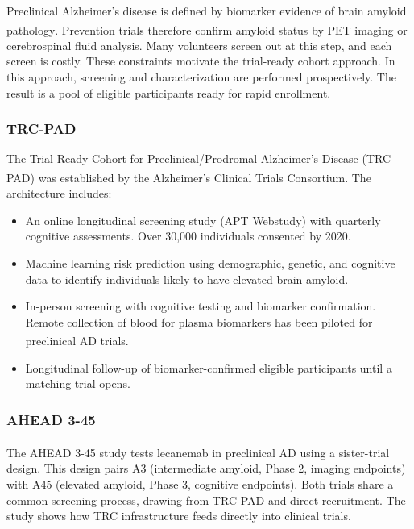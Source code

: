 \documentclass[
  11pt,
]{article}
\providecommand{\tightlist}{%
  \setlength{\itemsep}{0pt}\setlength{\parskip}{0pt}}
\begin{document}
Preclinical Alzheimer's disease is defined by biomarker
evidence of brain amyloid pathology\textsuperscript{}. Prevention trials therefore
confirm amyloid status by PET imaging or cerebrospinal
fluid analysis. Many volunteers screen out at this step,
and each screen is costly. These
constraints motivate the trial-ready cohort approach. In this
approach, screening and characterization are performed
prospectively. The result is a pool of eligible participants
ready for rapid enrollment.

\subsubsection{TRC-PAD}\label{trc-pad}

The Trial-Ready Cohort for Preclinical/Prodromal Alzheimer's
Disease (TRC-PAD) was established by the Alzheimer's Clinical
Trials Consortium\textsuperscript{}. The architecture
includes:

\begin{itemize}
\tightlist
\item
  An online longitudinal screening study (APT Webstudy) with
  quarterly cognitive assessments. Over 30,000 individuals
  consented by 2020.
\item
  Machine learning risk prediction using demographic, genetic,
  and cognitive data to identify individuals likely to have
  elevated brain amyloid.
\item
  In-person screening with cognitive testing and biomarker
  confirmation. Remote collection of blood for plasma
  biomarkers has been piloted for preclinical AD trials\textsuperscript{}.
\item
  Longitudinal follow-up of biomarker-confirmed eligible
  participants until a matching trial opens.
\end{itemize}

\subsubsection{AHEAD 3-45}\label{ahead-3-45}

The AHEAD 3-45 study\textsuperscript{} tests lecanemab in
preclinical AD using a sister-trial design. This design pairs
A3 (intermediate amyloid, Phase 2, imaging endpoints) with A45
(elevated amyloid, Phase 3, cognitive endpoints). Both trials
share a common screening process, drawing from TRC-PAD and
direct recruitment. The study shows how TRC infrastructure
feeds directly into clinical trials.
\end{document}
